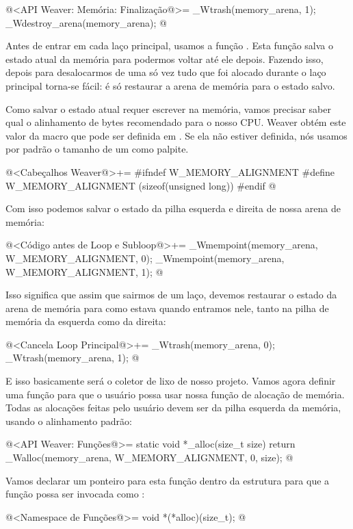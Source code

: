 \iniciocodigo
@<API Weaver: Memória: Finalização@>=
_Wtrash(memory_arena, 1);
_Wdestroy_arena(memory_arena);
@
\fimcodigo

Antes de entrar em cada laço principal, usamos a
função . Esta função salva o estado atual da
memória para podermos voltar até ele depois. Fazendo isso, depois para
desalocarmos de uma só vez tudo que foi alocado durante o laço
principal torna-se fácil: é só restaurar a arena de memória para o
estado salvo.

Como salvar o estado atual requer escrever na memória, vamos precisar
saber qual o alinhamento de bytes recomendado para o nosso CPU. Weaver
obtém este valor da macro  que pode
ser definida em . Se ela não estiver definida,
nós usamos por padrão o tamanho de um  como
palpite.

\iniciocodigo
@<Cabeçalhos Weaver@>+=
#ifndef W_MEMORY_ALIGNMENT
#define W_MEMORY_ALIGNMENT (sizeof(unsigned long))
#endif
@
\fimcodigo

Com isso podemos salvar o estado da pilha esquerda e direita de nossa
arena de memória:

\iniciocodigo
@<Código antes de Loop e Subloop@>+=
_Wmempoint(memory_arena, W_MEMORY_ALIGNMENT, 0);
_Wmempoint(memory_arena, W_MEMORY_ALIGNMENT, 1);
@
\fimcodigo

Isso significa que assim que sairmos de um laço, devemos restaurar o
estado da arena de memória para como estava quando entramos nele,
tanto na pilha de memória da esquerda como da direita:

\iniciocodigo
@<Cancela Loop Principal@>+=
_Wtrash(memory_arena, 0);
_Wtrash(memory_arena, 1);
@
\fimcodigo

E isso basicamente será o coletor de lixo de nosso projeto. Vamos
agora definir uma função para que o usuário possa usar nossa função de
alocação de memória. Todas as alocações feitas pelo usuário devem ser
da pilha esquerda da memória, usando o alinhamento padrão:

\iniciocodigo
@<API Weaver: Funções@>=
static void *_alloc(size_t size){
  return _Walloc(memory_arena, W_MEMORY_ALIGNMENT, 0, size);
}
@
\fimcodigo

Vamos declarar um ponteiro para esta função dentro da
estrutura  para que a função possa ser invocada
como :

\iniciocodigo
@<Namespace de Funções@>=
void *(*alloc)(size_t);
@
\fimcodigo


